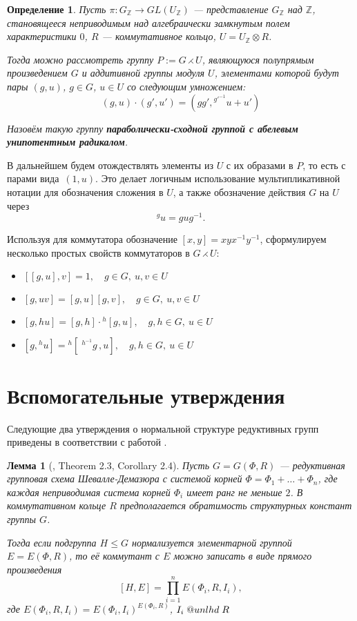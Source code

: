 \documentclass[12pt]{matmex-diploma}
\makeatletter
\newcommand{\slunlhd}{%
  \mathrel{\mathpalette\sl@unlhd\relax}%
}
\newcommand{\sl@unlhd}[2]{%
  \sbox\z@{$#1\lhd$}%
  \sbox\tw@{$#1\leqslant$}%
  \dimen@=\ht\tw@
  \advance\dimen@-\ht\z@
  \ifx#1\displaystyle
    \advance\dimen@ .2pt
  \else
    \ifx#1\textstyle
      \advance\dimen@ .2pt
    \fi
  \fi
  \ooalign{\raisebox{\dimen@}{$\m@th#1\lhd$}\cr$\m@th#1\leqslant$\cr}%
}
\theoremstyle{mystyleni}
\theoremstyle{mystyle}
\newtheorem{lm}{Лемма}
\newtheorem{definition}{Определение}
\newenvironment{framed}
    {
\vspace{1.5ex}
\begin{tcolorbox}[colback=white, grow to left by=1.2em, grow to right by=1.2em, enhanced]
    }
    {
\end{tcolorbox}
    }
\newcommand{\Z}{\mathbb{Z}}
\renewcommand{\le}{\leqslant}
\renewcommand{\trianglelefteq}{\slunlhd}
\makeatother
\begin{document}
\begin{framed}
\begin{definition}
Пусть $\pi:G_\Z \to GL(U_\Z)$ --- представление $G_\Z$ над $\Z$, становящееся неприводимым над алгебраически замкнутым полем характеристики $0$, $R$ --- коммутативное кольцо, $U=U_\Z\otimes R$.

Тогда можно рассмотреть группу $P:=G\rightthreetimes U$, являющуюся полупрямым произведением $G$ и аддитивной группы модуля $U$, элементами которой будут пары $(g,u)$, $g \in G$, $u \in U$ со следующим умножением:
$$
(g,u)\cdot (g',u') = (g g', {}^{g'^{-1}} u + u')
$$

Назовём такую группу \textit{\textbf{параболически-сходной группой с абелевым унипотентным радикалом}}.
\end{definition}
\end{framed}

В дальнейшем будем отождествлять элементы из $U$ с их образами в $P$, то есть с парами вида~$(1,u)$.
Это делает логичным использование мультипликативной нотации для обозначения сложения в $U$, а также обозначение действия $G$ на $U$ через $$^{g}u = g u g^{-1}.$$ 

Используя для коммутатора обозначение $[x,y]=x y x^{-1}y^{-1}$,
сформулируем несколько простых свойств коммутаторов в $G \rightthreetimes U$:

\begin{itemize}[label={\LARGE\raisebox{-0.5ex}{\textbullet}\quad},leftmargin=4\parindent]
\item
$[[g,u],v] = 1, \quad g \in G, \ u,v \in U $
\linespread{3}
\item 
$[g,uv] = [g,u][g,v], \quad g \in G, \ u,v \in U $
\item
$[g,hu] = [g,h]\cdot{}^h[g,u], \quad g,h \in G, \ u \in U $
\item
$[g,{}^{h}u] = {}^h[\;{}^{h^{-1}}g\,,u], \quad g,h \in G, \ u \in U $
\end{itemize}


\section{Вспомогательные утверждения}

Следующие два утверждения о нормальной структуре редуктивных групп приведены в соответствии с работой \citep{Stavrova2009}.

\begin{lm}[\citep{Stavrova2009}, Theorem 2.3, Corollary 2.4]
  \label{directproduct}
  Пусть $G = G(\Phi, R)$ --- редуктивная групповая схема Шевалле-Демазюра
  с системой корней $\Phi = \Phi_1 + \ldots + \Phi_n$, где каждая неприводимая система корней $\Phi_i$ имеет ранг не меньше $2$. В коммутативном кольце $R$ предполагается обратимость структурных констант группы $G$.
  
  Тогда если подгруппа $H \le G$ нормализуется элементарной группой $E = E(\Phi,R)$, то её коммутант с $E$ можно записать в виде прямого произведения
  $$ [H, E] = \prod_{i=1}^n E(\Phi_i,R,I_i), $$
  где $E(\Phi_i,R,I_i) = E(\Phi_i,I_i)^{E(\Phi_i,R)}$, $I_i \trianglelefteq R$
\end{lm}
\end{document}
